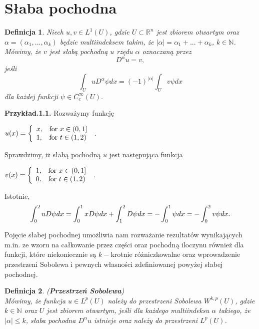 \documentclass[12pt,a4paper,oneside,titlepage]{article}
\newtheorem{Def}{Definicja}
\begin{document}
\section{Słaba pochodna}
\begin{Def}
Niech $u, v \in L^{1}(U)$, gdzie $U \subset \mathbb{R}^{n}$ jest zbiorem otwartym oraz $\alpha = (\alpha_1, ..., \alpha_k)$ będzie multiindeksem takim, że $\vert \alpha \vert = \alpha_1 + ... + \alpha_k$, $k \in \mathbb{N}$. Mówimy, że $v$ jest słabą pochodną $u$ rzędu $\alpha$ oznaczaną przez
\begin{equation}
D^{\alpha} u =v,
\end{equation}
 jeśli 
\begin{equation}
\int_{U} u D^{\alpha}\psi dx = (-1)^{\vert \alpha \vert} \int_{U} v \psi dx
\end{equation} 
dla każdej funkcji $\psi \in C^{\infty}_{c}(U)$.
\end{Def}

\textbf{Przykład.1.1.}
Rozważymy funkcję 
\begin{center}
$
u (x)  = \left\{ \begin{array}{ll}
x, & \textrm{for $x \in (0,1]$}\\
1, & \textrm{for $ t \in (1, 2) $} \\
\end{array} \right.
$ .
\end{center}
Sprawdzimy, iż słabą pochodną $u$ jest następująca funkcja
\begin{center}
$
v (x)  = \left\{ \begin{array}{ll}
1, & \textrm{for $x \in (0,1]$}\\
0, & \textrm{for $ t \in (1, 2) $} \\
\end{array} \right.
$ .
\end{center}
\newpage
Istotnie,
\begin{equation}
\nonumber
\int_0^2 u D\psi dx = \int_0^1 x D\psi dx + \int_1^2 D \psi dx = -\int_0^1 \psi dx = - \int_0^2 v \psi dx . \\
\end{equation}
\bigskip

Pojęcie słabej pochodnej umożliwia nam rozważanie rezultatów wynikających m.in. ze wzoru na całkowanie przez części oraz pochodną iloczynu również dla funkcji, które niekoniecznie są $k-$krotnie różniczkowalne oraz wprowadzenie przestrzeni Sobolewa i pewnych własności zdefiniowanej powyżej słabej pochodnej.

\begin{Def} (\textbf{Przestrzeń Sobolewa}) \\   Mówimy, że funkcja $u \in L^{p}(U)$ należy do przestrzeni Sobolewa $W^{k,p}(U)$, gdzie $k \in \mathbb{N}$ oraz $U$ jest zbiorem otwartym, jeśli dla każdego multiindeksu $\alpha$ takiego, że $\vert \alpha \vert \leq k$, słaba pochodna $D^{\alpha}u$ istnieje oraz należy do przestrzeni $L^{p}(U)$.
\end{Def}
\end{document}
